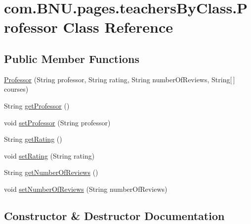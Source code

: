\hypertarget{classcom_1_1_b_n_u_1_1pages_1_1teachers_by_class_1_1_professor}{}\section{com.\+B\+N\+U.\+pages.\+teachers\+By\+Class.\+Professor Class Reference}
\label{classcom_1_1_b_n_u_1_1pages_1_1teachers_by_class_1_1_professor}
\subsection*{Public Member Functions}
\begin{DoxyCompactItemize}
\item 
\mbox{\hyperlink{classcom_1_1_b_n_u_1_1pages_1_1teachers_by_class_1_1_professor_a0373cad09a3fe4134ad473eed5aea66a}{Professor}} (String professor, String rating, String number\+Of\+Reviews, String\mbox{[}$\,$\mbox{]} courses)
\item 
String \mbox{\hyperlink{classcom_1_1_b_n_u_1_1pages_1_1teachers_by_class_1_1_professor_a2bba2c812e51e0a3fce524299e48dc1d}{get\+Professor}} ()
\item 
void \mbox{\hyperlink{classcom_1_1_b_n_u_1_1pages_1_1teachers_by_class_1_1_professor_a9890c4e2879b7ea77780352aee848e5d}{set\+Professor}} (String professor)
\item 
String \mbox{\hyperlink{classcom_1_1_b_n_u_1_1pages_1_1teachers_by_class_1_1_professor_adec832cd2270176afc4dc5aeec0b796a}{get\+Rating}} ()
\item 
void \mbox{\hyperlink{classcom_1_1_b_n_u_1_1pages_1_1teachers_by_class_1_1_professor_ae4c9dad399b6184f1b92b3eaeedea361}{set\+Rating}} (String rating)
\item 
String \mbox{\hyperlink{classcom_1_1_b_n_u_1_1pages_1_1teachers_by_class_1_1_professor_aef9a29c95e09319167d11770fd3e1bc4}{get\+Number\+Of\+Reviews}} ()
\item 
void \mbox{\hyperlink{classcom_1_1_b_n_u_1_1pages_1_1teachers_by_class_1_1_professor_a5f1c979a405522a9412ed12f62f41002}{set\+Number\+Of\+Reviews}} (String number\+Of\+Reviews)
\end{DoxyCompactItemize}


\subsection{Constructor \& Destructor Documentation}
\mbox{\label{classcom_1_1_b_n_u_1_1pages_1_1teachers_by_class_1_1_professor_a0373cad09a3fe4134ad473eed5aea66a}} 
